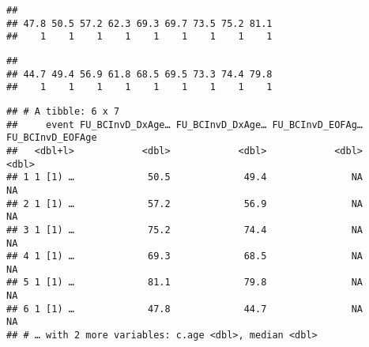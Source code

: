 \documentclass[
]{article}
\newenvironment{Shaded}{\begin{snugshade}}{\end{snugshade}}
\newcommand{\CommentTok}[1]{\textcolor[rgb]{0.56,0.35,0.01}{\textit{#1}}}
\newcommand{\DecValTok}[1]{\textcolor[rgb]{0.00,0.00,0.81}{#1}}
\newcommand{\KeywordTok}[1]{\textcolor[rgb]{0.13,0.29,0.53}{\textbf{#1}}}
\newcommand{\NormalTok}[1]{#1}
\newcommand{\OperatorTok}[1]{\textcolor[rgb]{0.81,0.36,0.00}{\textbf{#1}}}
\newcommand{\StringTok}[1]{\textcolor[rgb]{0.31,0.60,0.02}{#1}}
\begin{document}
\begin{verbatim}
## 
## 47.8 50.5 57.2 62.3 69.3 69.7 73.5 75.2 81.1 
##    1    1    1    1    1    1    1    1    1
\end{verbatim}

\begin{Shaded}
\end{Shaded}

\begin{verbatim}
## 
## 44.7 49.4 56.9 61.8 68.5 69.5 73.3 74.4 79.8 
##    1    1    1    1    1    1    1    1    1
\end{verbatim}

\begin{Shaded}
\end{Shaded}

\begin{verbatim}
## # A tibble: 6 x 7
##     event FU_BCInvD_DxAge… FU_BCInvD_DxAge… FU_BCInvD_EOFAg… FU_BCInvD_EOFAge
##   <dbl+l>            <dbl>            <dbl>            <dbl>            <dbl>
## 1 1 [1) …             50.5             49.4               NA               NA
## 2 1 [1) …             57.2             56.9               NA               NA
## 3 1 [1) …             75.2             74.4               NA               NA
## 4 1 [1) …             69.3             68.5               NA               NA
## 5 1 [1) …             81.1             79.8               NA               NA
## 6 1 [1) …             47.8             44.7               NA               NA
## # … with 2 more variables: c.age <dbl>, median <dbl>
\end{verbatim}
\end{document}
